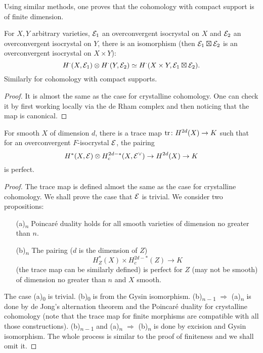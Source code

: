 Using similar methods, one proves that 
the cohomology with compact support is of finite dimension.
\begin{theorem}
    For $X,Y$ arbitrary varieties, ${\mathcal {E}}_1$ an overconvergent isocrystal on $X$ 
    and ${\mathcal {E}}_2$ an overconvergent isocrystal on $Y$, 
    there is an isomorphism 
    (then ${\mathcal {E}}_1 \boxtimes {\mathcal {E}}_2$ is an overconvergent isocrystal on $X \times Y$):
    \[
        H^\cdot(X, {\mathcal {E}}_1) \otimes H^\cdot(Y, {\mathcal {E}}_2) \simeq H^\cdot(X \times Y, {\mathcal {E}}_1 \boxtimes {\mathcal {E}}_2).
    \]
    Similarly for cohomology with compact supports.
\end{theorem}

\begin{proof}
    It is almost the same as the case for crystalline cohomology. 
    One can check it by first working locally 
    via the de Rham complex and then noticing that the map is canonical. 
\end{proof}

\begin{theorem}
    For smooth $X$ of dimension $d$, 
    there is a trace map $\operatorname{tr} \colon H^{2d}(X) \to K$ such that 
    for an overconvergent $F$-isocrystal ${\mathcal {E}}$, the pairing
    \[
        H^*(X, {\mathcal {E}}) \otimes H^{2d-*}_c(X, {\mathcal {E}}^\vee) \to H^{2d}(X) \to K
    \]
    is perfect.
\end{theorem}

\begin{proof}
    The trace map is defined almost the same as the case for crystalline cohomology. 
    We shall prove the case that ${\mathcal {E}}$ is trivial. We consider two propositions:
    \begin{itemize}
        \item [(a)\textsubscript{$n$}] 
            Poincar\'e duality holds 
            for all smooth varieties of dimension no greater than $n$.
        \item [(b)\textsubscript{$n$}] 
            The pairing ($d$ is the dimension of $Z$)
            \[
                H^*_Z(X) \times H^{2d-*}_c(Z) \to K
            \] 
            (the trace map can be similarly defined) is perfect 
            for $Z$ (may not be smooth) of dimension no greater than $n$ and $X$ smooth.
    \end{itemize}
    The case (a)\textsubscript{$0$} is trivial. 
    (b)\textsubscript{$0$} is from the Gysin isomorphism. 
    (b)\textsubscript{$n-1$} $\Rightarrow$ (a)\textsubscript{$n$} is done 
    by de Jong's alternation theorem 
    and the Poincar\'e duality for crystalline cohomology 
    (note that the trace map for finite morphisms are compatible with all those constructions). 
    (b)\textsubscript{$n-1$} and 
    (a)\textsubscript{$n$} $\Rightarrow$ (b)\textsubscript{$n$} is done 
    by excision and Gysin isomorphism. 
    The whole process is similar to the proof of finiteness and we shall omit it.
\end{proof}

